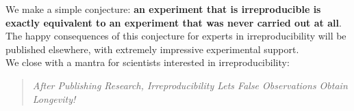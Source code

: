 \documentclass[a4paper,11pt]{article}
\begin{document}
We make a simple conjecture: {\textbf{an experiment that is
irreproducible is exactly equivalent to an experiment that was never
carried out at all}}. The happy consequences of this conjecture for
experts in irreproducibility will be published elsewhere, with
extremely impressive experimental support.\\

\noindent We close with a mantra for scientists interested in irreproducibility:
\begin{quote}
\emph{After
Publishing
Research,
Irreproducibility 
Lets
False
Observations
Obtain
Longevity!}
\end{quote}














\end{document}
